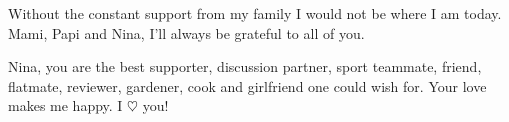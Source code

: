 Without the constant support from my family I would not be where I am today. Mami, Papi and Nina, I'll always be grateful to all of you.

Nina, you are the best supporter, discussion partner, sport teammate, friend, flatmate, reviewer, gardener, cook and girlfriend one could wish for. Your love makes me happy. I {\color{red}$\heartsuit$} you!
\endgroup

